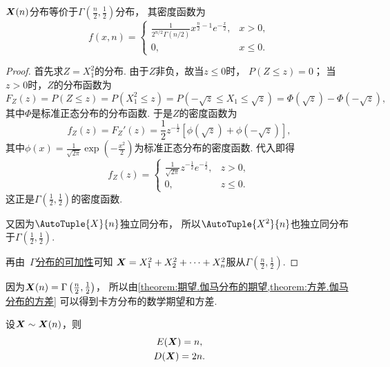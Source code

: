 \begin{theorem}\label{theorem:数理统计的基础知识.卡方分布的密度函数}
\(\boldsymbol{X}(n)\)分布等价于\(\Gamma\left(\frac{n}{2},\frac{1}{2}\right)\)分布，
其密度函数为\begin{equation}
	f(x,n) = \left\{ \begin{array}{cl}
		\frac{1}{2^{n/2} \Gamma(n/2)} x^{\frac{n}{2}-1} e^{-\frac{x}{2}}, & x > 0, \\
		0, & x \leq 0.
	\end{array} \right.
\end{equation}
\begin{proof}
首先求\(Z=X_1^2\)的分布.
由于\(Z\)非负，故当\(z \leq 0\)时，
\(P(Z \leq z) = 0\)；
当\(z > 0\)时，\(Z\)的分布函数为\[
	F_Z(z) = P(Z \leq z)
	= P(X_1^2 \leq z)
	= P(-\sqrt{z} \leq X_1 \leq \sqrt{z})
	= \Phi(\sqrt{z}) - \Phi(-\sqrt{z}),
\]
其中\(\Phi\)是标准正态分布的分布函数.
于是\(Z\)的密度函数为\[
	f_Z(z)
	= F_Z'(z)
	= \frac12 z^{-\frac12} \left[
		\phi(\sqrt{z}) + \phi(-\sqrt{z})
	\right],
\]
其中\(\phi(x) = \frac{1}{\sqrt{2\pi}} \exp(-\frac{x^2}{2})\)为标准正态分布的密度函数.
代入即得\[
	f_Z(z) = \left\{ \begin{array}{cl}
		\frac{1}{\sqrt{2\pi}} z^{-\frac12} e^{-\frac{z}{2}}, & z>0, \\
		0, & z \leq 0.
	\end{array} \right.
\]
这正是\(\Gamma\left(\frac12,\frac12\right)\)的密度函数.

又因为\(\AutoTuple{X}{n}\)独立同分布，
所以\(\AutoTuple{X^2}{n}\)也独立同分布于\(\Gamma\left(\frac12,\frac12\right)\).

再由~\hyperref[theorem:多维随机变量及其分布.伽马分布的可加性1]{\(\Gamma\)分布的可加性}可知
\(\boldsymbol{X} = X_1^2+X_2^2+\dotsb+X_n^2\)服从\(\Gamma\left(\frac{n}{2},\frac12\right)\).
\end{proof}
\end{theorem}

因为\(\boldsymbol{X}(n)=\Gamma\left(\frac{n}{2},\frac12\right)\)，
所以由\cref{theorem:期望.伽马分布的期望,theorem:方差.伽马分布的方差}
可以得到卡方分布的数学期望和方差.
\begin{corollary}\label{theorem:数理统计的基础知识.卡方分布的数字特征}
设\(\boldsymbol{X} \sim \boldsymbol{X}(n)\)，则
\begin{gather}
	E(\boldsymbol{X}) = n, \\
	D(\boldsymbol{X}) = 2n.
\end{gather}
\end{corollary}

